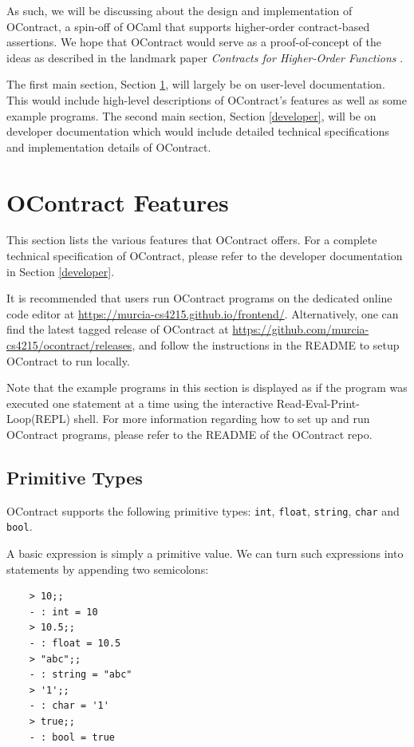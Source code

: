 \documentclass[a4paper]{article}
\begin{document}
As such, we will be discussing about the design and implementation of OContract, a spin-off of OCaml that supports higher-order contract-based assertions.
We hope that OContract would serve as a proof-of-concept of the ideas as described in the landmark paper \emph{Contracts for Higher-Order Functions} \cite{contracts}.

The first main section, Section \ref{user}, will largely be on user-level documentation. This would include high-level descriptions of OContract's features as well as some example programs.
The second main section, Section \ref{developer}, will be on developer documentation which would include detailed technical specifications and implementation details of OContract.

\section{OContract Features}
\label{user}

This section lists the various features that OContract offers.
For a complete technical specification of OContract, please refer to the developer documentation in Section \ref{developer}.

It is recommended that users run OContract programs on the dedicated online code editor at \url{https://murcia-cs4215.github.io/frontend/}.
Alternatively, one can find the latest tagged release of OContract at \url{https://github.com/murcia-cs4215/ocontract/releases}, and follow the instructions in the README to setup OContract to run locally.

Note that the example programs in this section is displayed as if the program was executed one statement at a time using the interactive Read-Eval-Print-Loop(REPL) shell.
For more information regarding how to set up and run OContract programs, please refer to the README of the OContract repo.

\subsection{Primitive Types}

OContract supports the following primitive types: \texttt{int}, \texttt{float}, \texttt{string}, \texttt{char} and \texttt{bool}.

A basic expression is simply a primitive value. We can turn such expressions into statements by appending two semicolons:

\begin{verbatim}
    > 10;;
    - : int = 10
    > 10.5;;
    - : float = 10.5
    > "abc";;
    - : string = "abc"
    > '1';;
    - : char = '1'
    > true;;
    - : bool = true
\end{verbatim}
\end{document}

